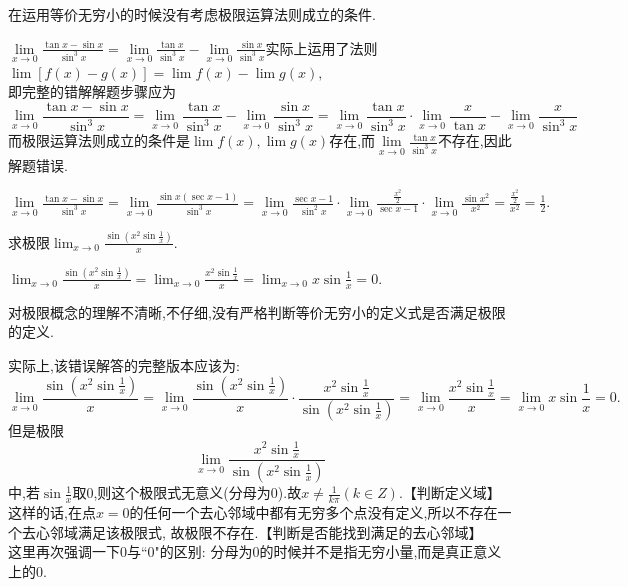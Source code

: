 \errreason  在运用等价无穷小的时候没有考虑极限运算法则成立的条件.

\solvereason $\displaystyle \lim\limits_{x \to 0}\frac{\tan x -\sin x}{\sin^3 x}=\lim\limits_{x \to 0}\frac{\tan x}{\sin^3 x} - \lim\limits_{x \to 0}\frac{\sin x}{\sin^3 x}$实际上运用了法则$\lim [f(x)-g(x)]=\lim f(x)-\lim g(x),$\\[1em]即完整的错解解题步骤应为
\begin{equation*}
	\lim\limits_{x \to 0}\frac{\tan x -\sin x}{\sin^3 x}=\lim\limits_{x \to 0}\frac{\tan x}{\sin^3 x} - \lim\limits_{x \to 0}\frac{\sin x}{\sin^3 x}
	=\lim\limits_{x \to 0}\frac{\tan x}{\sin^3 x}\cdot \lim\limits_{x \to 0} \frac{x}{\tan x}-\lim\limits_{x \to 0}\frac{x}{\sin^3 x}
\end{equation*}
而极限运算法则成立的条件是$\lim f(x),\lim g(x)$存在,而$\displaystyle \lim\limits_{x \to 0}\frac{\tan x}{\sin^3 x}$不存在,因此解题错误.

\solve $\displaystyle \lim\limits_{x \to 0}\frac{\tan x -\sin x}{\sin^3 x}=\lim\limits_{x \to 0}\frac{\sin x(\sec x-1)}{\sin^3 x}=\lim\limits_{x \to 0}\frac{\sec x-1}{\sin^2 x} \cdot \lim\limits_{x \to 0}\frac{\frac{x^2}{2}}{\sec x -1} \cdot \lim\limits_{x \to 0}\frac{\sin x^2}{x^2}
=\frac{\frac{x^2}{2}}{x^2}=\frac{1}{2}.$\jg

\examples 求极限$\displaystyle \lim_{x \to 0} \frac{\sin \left(x^2 \sin{\frac{1}{x}}\right) }{x}.$

\errsolve $\displaystyle \lim_{x \to 0}\frac{\sin \left(x^2 \sin{\frac{1}{x}}\right) }{x}=\lim_{x \to 0}\frac{x^2 \sin \frac{1}{x}}{x}=\lim_{x \to 0}x\sin\frac{1}{x}=0.$

\errreason 对极限概念的理解不清晰,不仔细,没有严格判断等价无穷小的定义式是否满足极限的定义.

\solvereason 实际上,该错误解答的完整版本应该为:
\[
\lim_{x \to 0} \frac{\sin \left(x^2 \sin{\frac{1}{x}}\right) }{x}=\lim_{x \to 0} \frac{\sin \left(x^2 \sin{\frac{1}{x}}\right) }{x}\cdot\frac{x^2\sin \frac{1}{x}}{\sin \left( x^2 \sin \frac{1}{x}\right) }=\lim_{x \to 0}\frac{x^2\sin\frac{1}{x}}{x}=\lim_{x \to 0}x\sin \frac{1}{x}=0.
\]
但是极限
\[
\lim_{x \to 0}\frac{x^2\sin \frac{1}{x}}{\sin \left( x^2\sin \frac{1}{x}\right) }
\]
中,若$\displaystyle \sin \frac{1}{x}$取0,则这个极限式无意义(分母为0).故$\displaystyle x \ne \frac{1}{k \pi}(k \in Z).$\hspace*{11.5em}【判断定义域】\\[0.5em]
\hspace*{2em}这样的话,在点$x = 0$的任何一个去心邻域中都有无穷多个点没有定义,所以不存在一个去心邻域满足该极限式,
故极限不存在.\hspace*{24em}【判断是否能找到满足的去心邻域】\\[0.5em]
这里再次强调一下0与``0"的区别: 分母为0的时候并不是指无穷小量,而是真正意义上的0.

